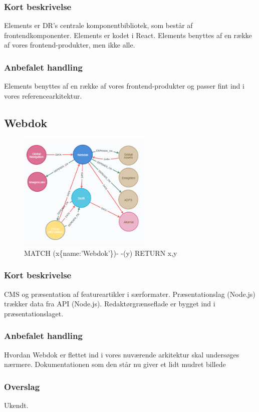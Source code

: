 \documentclass{article}
\begin{document}
\subsubsection{Kort beskrivelse}
Elements er DR's centrale komponentbibliotek, som består af frontendkomponenter. Elements er kodet i React. Elements benyttes af en række af vores frontend-produkter, men ikke alle.
\subsubsection{Anbefalet handling}
Elements benyttes af en række af vores frontend-produkter og passer fint ind i vores referencearkitektur.


\subsection{Webdok}
\begin{figure}[h]
\includegraphics[width=180pt]{Webdok.PNG}
\caption{MATCH (x\{name:'Webdok'\})- -(y) RETURN x,y}
\end{figure}
\subsubsection{Kort beskrivelse}
CMS og præsentation af featureartikler i særformater.	
Præsentationslag (Node.js) trækker data fra API (Node.js). Redaktørgrænseflade er bygget ind i præsentationslaget.
\subsubsection{Anbefalet handling}
Hvordan Webdok er flettet ind i vores nuværende arkitektur skal undersøges nærmere. Dokumentationen som den står nu giver et lidt mudret billede
\subsubsection{Overslag}
Ukendt.
\end{document}

